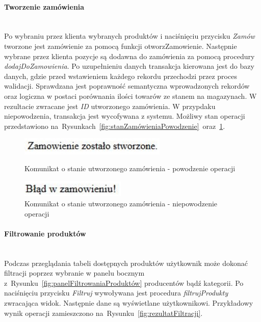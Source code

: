 \documentclass[a4paper, 12pt]{article}
\begin{document}
\paragraph{Tworzenie zamówienia} \mbox{}\\
Po wybraniu przez klienta wybranych produktów i naciśnięciu przycisku \textit{Zamów} tworzone jest zamówienie za pomocą funkcji otworzZamowienie. Następnie wybrane przez klienta pozycje są dodawna do zamówienia za pomocą procedury \textit{dodajDoZamowienia}. Po uzupełnieniu danych transakcja kierowana jest do bazy danych, gdzie przed wstawieniem każdego rekordu przechodzi przez proces walidacji. Sprawdzana jest poprawność semantyczna wprowadzonych rekordów oraz logiczna w postaci porównania ilości towarów ze stanem na magazynach. W rezultacie zwracane jest \textit{ID} utworzonego zamówienia. W przypdaku niepowodzenia, transakcja jest wycofywana z systemu. Możliwy stan operacji przedstawiono na~Rysunkach~\ref{fig:stanZamówieniaPowodzenie}~oraz~\ref{fig:stanZamówieniaNiepowodzenie}.

\begin{figure}[H]
	\centering
	\includegraphics[width=7cm]{Screeny/ZamowieniePoprawne.JPG}
	\caption[Stan zamówienia - powodzenie operacji]{Komunikat o stanie utworzonego zamówienia - powodzenie operacji}
	\label{fig:stanZamówieniaPowodzenie}

	\includegraphics[width=5cm]{Screeny/ZamowienieNiepoprawne.JPG}
	\caption[Stan zamówienia - niepowodzenie operacji]{Komunikat o stanie utworzonego zamówienia - niepowodzenie operacji}
	\label{fig:stanZamówieniaNiepowodzenie}
\end{figure}
\paragraph{Filtrowanie produktów} \mbox{}\\
Podczas przeglądania tabeli dostępnych produktów użytkownik może dokonać filtracji poprzez wybranie w panelu bocznym z~Rysunku~\ref{fig:panelFiltrowaniaProduktów} producentów bądź kategorii. Po naciśnięciu przycisku \textit{Filtruj} wywoływana jest procedura \textit{filtrujProdukty} zwracająca widok. Następnie dane są wyświetlane użytkownikowi. Przykładowy wynik operacji zamieszczono na~Rysunku~\ref{fig:rezultatFiltracji}.
\end{document}
